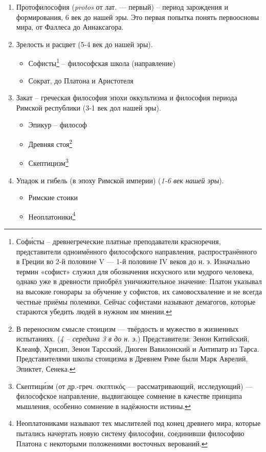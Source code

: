\documentclass[
]{article}
\providecommand{\tightlist}{%
  \setlength{\itemsep}{0pt}\setlength{\parskip}{0pt}}
\begin{document}
\begin{enumerate}
\def\labelenumi{\arabic{enumi}.}
\item
  Протофилософия (\emph{protos} от лат. --- первый) -- период зарождения
  и формирования, 6 век до нашей эры. Это первая попытка понять
  первоосновы мира, от Фаллеса до Аннаксагора.
\item
  Зрелость и расцвет (5-4 век до нашей эры).

  \begin{itemize}
  \tightlist
  \item
    Софисты\footnote{Софи́сты -- древнегреческие платные преподаватели
      красноречия, представители одноимённого философского направления,
      распространённого в Греции во 2-й половине V --- 1-й половине IV
      веков до н. э. Изначально термин «софист» служил для обозначения
      искусного или мудрого человека, однако уже в древности приобрёл
      уничижительное значение: Платон указывал на высокие гонорары за
      обучение у софистов, их самовосхваление и не всегда честные приёмы
      полемики. Сейчас софистами называют демагогов, которые стараются
      убедить людей в нужном им мнении.} -- философская школа
    (направление)
  \item
    Сократ, до Платона и Аристотеля
  \end{itemize}
\item
  Закат -- греческая философия эпохи оккультизма и философия периода
  Римской республики (3-1 век дол нашей эры).

  \begin{itemize}
  \tightlist
  \item
    Эпикур -- философ
  \item
    Древняя стоя\footnote{В переносном смысле стоицизм --- твёрдость и
      мужество в жизненных испытаниях. (\emph{4 -- середина 3 в до н.
      э.}) Представители: Зенон Китийский, Клеанф, Хрисип, Зенон
      Тарсский, Диоген Вавилонский и Антипатр из Тарса. Представителями
      школы стоицизма в Древнем Риме были Марк Аврелий, Эпиктет, Сенека.}
  \item
    Скептицизм\footnote{Скептици́зм (от др.-греч. σκεπτικός ---
      рассматривающий, исследующий) --- философское направление,
      выдвигающее сомнение в качестве принципа мышления, особенно
      сомнение в надёжности истины.}
  \end{itemize}
\item
  Упадок и гибель (в эпоху Римской империи) (\emph{1-6 век нашей эры}).

  \begin{itemize}
  \tightlist
  \item
    Римские стоики
  \item
    Неоплатоники\footnote{Неоплатониками называют тех мыслителей под
      конец древнего мира, которые пытались начертать новую систему
      философии, соединивши философию Платона с некоторыми положениями
      восточных верований.}
  \end{itemize}
\end{enumerate}
\end{document}
